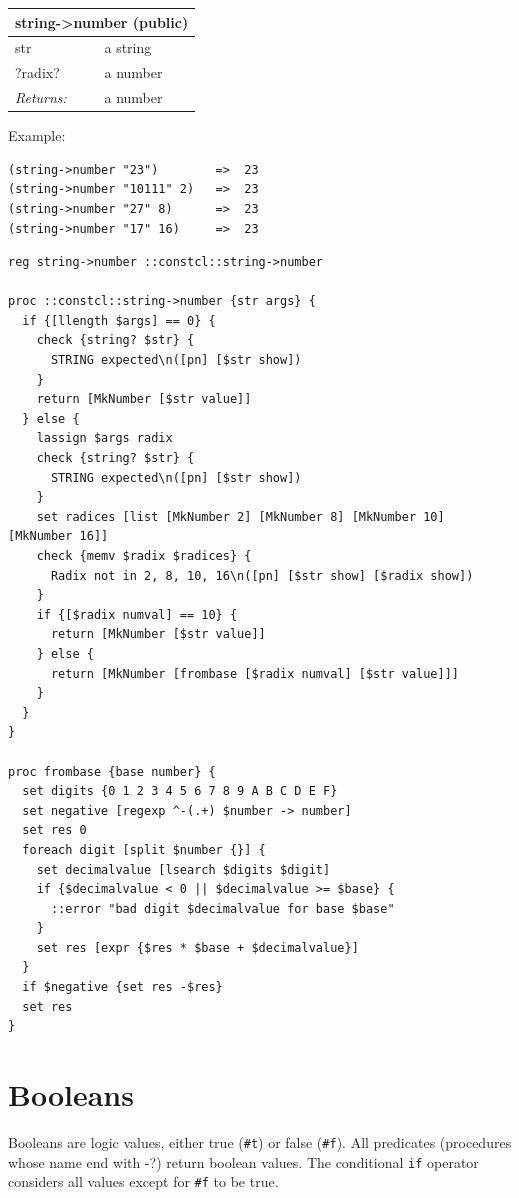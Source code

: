 \documentclass[twoside,9pt]{report}
\begin{document}
\begin{tabular}{ |l l| }
\hline
\multicolumn{2}{|l|}{string->number (public)} \\
\hline
str & a string \\
?radix? & a number \\
\textit{Returns:} & a number \\
\hline
\end{tabular}


Example:

\noindent\makebox[\linewidth]{\rule{\linewidth}{0.4pt}}
\begin{lstlisting}
(string->number "23")        =>  23
(string->number "10111" 2)   =>  23
(string->number "27" 8)      =>  23
(string->number "17" 16)     =>  23
\end{lstlisting}
\noindent\makebox[\linewidth]{\rule{\linewidth}{0.4pt}}
\noindent\makebox[\linewidth]{\rule{\linewidth}{0.4pt}}
\begin{lstlisting}
reg string->number ::constcl::string->number
 
proc ::constcl::string->number {str args} {
  if {[llength $args] == 0} {
    check {string? $str} {
      STRING expected\n([pn] [$str show])
    }
    return [MkNumber [$str value]]
  } else {
    lassign $args radix
    check {string? $str} {
      STRING expected\n([pn] [$str show])
    }
    set radices [list [MkNumber 2] [MkNumber 8] [MkNumber 10] [MkNumber 16]]
    check {memv $radix $radices} {
      Radix not in 2, 8, 10, 16\n([pn] [$str show] [$radix show])
    }
    if {[$radix numval] == 10} {
      return [MkNumber [$str value]]
    } else {
      return [MkNumber [frombase [$radix numval] [$str value]]]
    }
  }
}
 
proc frombase {base number} {
  set digits {0 1 2 3 4 5 6 7 8 9 A B C D E F}
  set negative [regexp ^-(.+) $number -> number]
  set res 0
  foreach digit [split $number {}] {
    set decimalvalue [lsearch $digits $digit]
    if {$decimalvalue < 0 || $decimalvalue >= $base} {
      ::error "bad digit $decimalvalue for base $base"
    }
    set res [expr {$res * $base + $decimalvalue}]
  }
  if $negative {set res -$res}
  set res
}
\end{lstlisting}
\noindent\makebox[\linewidth]{\rule{\linewidth}{0.4pt}}
\section{Booleans}
\label{booleans}

Booleans are logic values, either true (\texttt{\#t}) or false (\texttt{\#f}). All predicates (procedures whose name end with -?) return boolean values. The conditional \texttt{if} operator considers all values except for \texttt{\#f} to be true.
\end{document}
